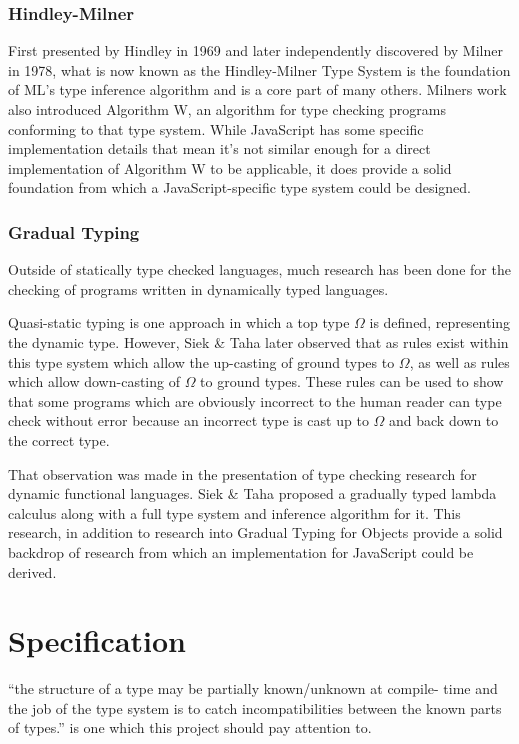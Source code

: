 \documentclass[british, twoside]{bhamthesis}
\theoremstyle{definition}
\begin{document}
    \subsection{Hindley-Milner}
      First presented by Hindley in 1969 and later independently discovered by Milner in 1978, what is now known as the Hindley-Milner Type System is the foundation of ML's type inference algorithm and is a core part of many others\autocite{Hindley1969}. Milners work also introduced Algorithm W, an algorithm for type checking programs conforming to that type system\autocite{Milner1978}. While JavaScript has some specific implementation details that mean it's not similar enough for a direct implementation of Algorithm W to be applicable, it does provide a solid foundation from which a JavaScript-specific type system could be designed.

    \subsection{Gradual Typing}
      Outside of statically type checked languages, much research has been done for the checking of programs written in dynamically typed languages.

      Quasi-static typing\autocite{Thatte1989} is one approach in which a top type $\Omega$ is defined, representing the dynamic type. However, Siek \& Taha later observed that as rules exist within this type system which allow the up-casting of ground types to $\Omega$, as well as rules which allow down-casting of $\Omega$ to ground types. These rules can be used to show that some programs which are obviously incorrect to the human reader can type check without error because an incorrect type is cast up to $\Omega$ and back down to the correct type\autocite{Siek2006}.

      That observation was made in the presentation of type checking research for dynamic functional languages. Siek \& Taha proposed a gradually typed lambda calculus along with a full type system and inference algorithm for it\autocite{Siek2006}. This research, in addition to research into Gradual Typing for Objects\autocite{Siek2007} provide a solid backdrop of research from which an implementation for JavaScript could be derived.


\chapter{Specification}

  ``the structure of a type may be partially known/unknown at compile- time and the job of the type system is to catch incompatibilities between the known parts of types.''\autocite{Siek2006} is one which this project should pay attention to.
\end{document}
